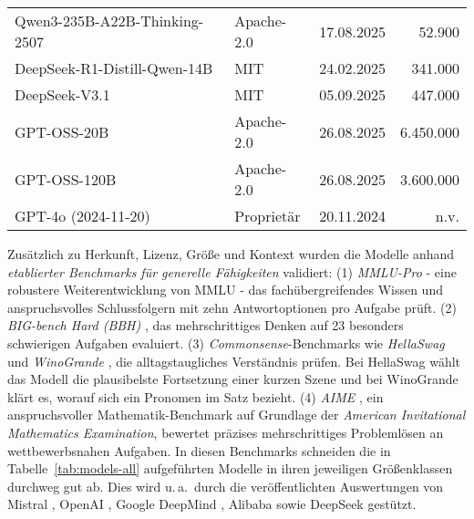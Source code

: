 \begin{sidewaystable}[htbp]
\begin{threeparttable}
\begin{subtable}[t]{0.49\linewidth}
\begin{tabular}{@{}p{6.3cm} l r r@{}}
                Qwen3-235B-A22B-Thinking-2507 & Apache-2.0 & 17.08.2025 & 52{.}900 \cite{HF_Qwen3_235B_2025} \\
                DeepSeek-R1-Distill-Qwen-14B & MIT & 24.02.2025 & 341{.}000 \cite{HF_DeepSeekR1_Distill_Qwen14B_2025} \\
                DeepSeek-V3.1 & MIT & 05.09.2025 & 447{.}000 \cite{HF_DeepSeek_V3_1_2025} \\
                GPT-OSS-20B & Apache-2.0 & 26.08.2025 & 6{.}450{.}000 \cite{OpenAI_GPTOSS_ModelCard_2025} \\
                GPT-OSS-120B & Apache-2.0 & 26.08.2025 & 3{.}600{.}000 \cite{OpenAI_GPTOSS_ModelCard_2025} \\
                GPT-4o (2024-11-20) & Proprietär & 20.11.2024 & n.v. \cite{openai-hello-gpt-4o} \\
                \bottomrule
            \end{tabular}
        \end{subtable}
    \end{threeparttable}
\end{sidewaystable}

Zusätzlich zu Herkunft, Lizenz, Größe und Kontext wurden die Modelle anhand \emph{etablierter Benchmarks für generelle Fähigkeiten} validiert: (1) \emph{MMLU-Pro} \cite{MMLU-Pro} - eine robustere Weiterentwicklung von MMLU \cite{MMLU} - das fachübergreifendes Wissen und anspruchsvolles Schlussfolgern mit zehn Antwortoptionen pro Aufgabe prüft. (2) \emph{BIG-bench Hard (BBH)} \cite{BBH}, das mehrschrittiges Denken auf 23 besonders schwierigen Aufgaben evaluiert. (3) \emph{Commonsense}-Benchmarks wie \emph{HellaSwag} \cite{hellaswag} und \emph{WinoGrande} \cite{winogrande}, die alltagstaugliches Verständnis prüfen. Bei HellaSwag wählt das Modell die plausibelste Fortsetzung einer kurzen Szene und bei WinoGrande klärt es, worauf sich ein Pronomen im Satz bezieht. (4) \emph{AIME} \cite{MAA_AIME_2025}, ein anspruchsvoller Mathematik-Benchmark auf Grundlage der \emph{American Invitational Mathematics Examination}, bewertet präzises mehrschrittiges Problemlösen an wettbewerbsnahen Aufgaben. In diesen Benchmarks schneiden die in Tabelle~\ref{tab:models-all} aufgeführten Modelle in ihren jeweiligen Größenklassen durchweg gut ab. Dies wird u.\,a.\ durch die veröffentlichten Auswertungen von Mistral \cite{Mistral_Large_Bench, mistral_models_benchmarks}, OpenAI \cite{OpenAI_GPTOSS_ModelCard_2025}, Google DeepMind \cite{HF_Gemma3_12B_2025, HF_Gemma3_27B_2025}, Alibaba \cite{HF_Qwen3_235B_2025, Qwen2p5_TechReport_2025} sowie DeepSeek \cite{HF_DeepSeekR1_Distill_Qwen14B_2025,HF_DeepSeek_V3_1_2025} gestützt.

